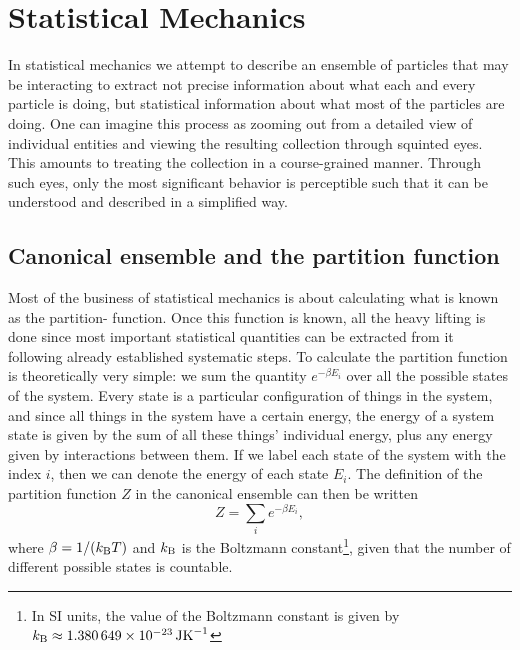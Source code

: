 \chapter{Statistical Mechanics}
\label{chap:statMech}
%
\noindent In statistical mechanics we attempt to describe an ensemble of particles that may be interacting
to extract not precise information about what each and every particle is doing, but statistical
information about what most of the particles are doing. One can imagine this process as zooming out
from a detailed view of individual entities and viewing the resulting collection through squinted eyes.
This amounts to treating the collection in a course-grained manner. Through such eyes, only the most significant
behavior is perceptible such that it can be understood and described in a simplified way.

\section{Canonical ensemble and the partition function}

Most of the business of statistical mechanics is about calculating what is known as the partition-
function. Once this function is known, all the heavy lifting is done since most important statistical
quantities can be extracted from it following already established systematic steps.
To calculate the partition function is theoretically very simple: we sum the quantity $e^{-\beta E_i}$
over all the possible states of the system. Every state is a particular configuration of things in
the system, and since all things in the system have a certain energy, the energy of a system state is
given by the sum of all these things' individual energy, plus any energy given by interactions between
them.
If we label
each state of the system with the index $i$, then we can denote the energy of each state $E_i$. The
definition of the partition function $Z$ in the canonical ensemble can then be written
\begin{equation}
    Z = \sum_i e^{-\beta E_i},
    \label{eq:statMech:partDef}
\end{equation}
where $\beta = 1/(\boltz T)$ and $\boltz$ is the Boltzmann constant\footnote{In SI units, the value of the 
Boltzmann constant is given by 
$\boltz \approx \SI{1.380649d-23}{JK^{-1}}$}, given that the number of different possible states is
countable.


